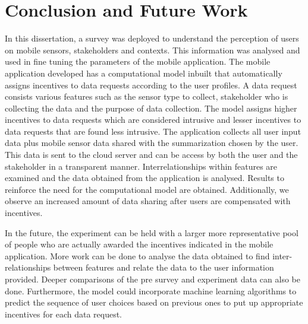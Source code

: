 \chapter{Conclusion and Future Work}

In this dissertation, a survey was deployed to understand the perception of users on mobile sensors, stakeholders and contexts. This information was analysed and used in fine tuning the parameters of the mobile application. The mobile application developed has a computational model inbuilt that automatically assigns incentives to data requests according to the user profiles. A data request consists various features such as the sensor type to collect, stakeholder who is collecting the data and the purpose of data collection. The model assigns higher incentives to data requests which are considered intrusive and lesser incentives to data requests that are found less intrusive. The application collects all user input data plus mobile sensor data shared with the summarization chosen by the user. This data is sent to the cloud server and can be access by both the user and the stakeholder in a transparent manner. Interrelationships within features are examined and the data obtained from the application is analysed. Results to reinforce the need for the computational model are obtained. Additionally, we observe an increased amount of data sharing after users are compensated with incentives.

In the future, the experiment can be held with a larger more representative pool of people who are actually awarded the incentives indicated in the mobile application. More work can be done to analyse the data obtained to find inter-relationships between features and relate the data to the user information provided. Deeper comparisons of the pre survey and experiment data can also be done. Furthermore, the model could incorporate machine learning algorithms to predict the sequence of user choices based on previous ones to put up appropriate incentives for each data request.
